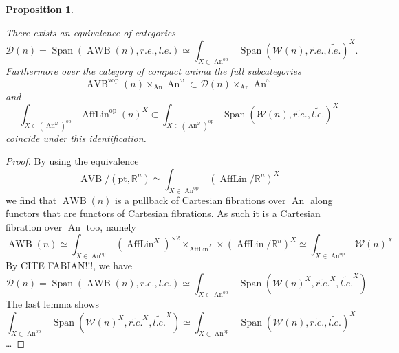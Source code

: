 \documentclass{article}
\newcommand{\R}{\mathbb{R}} %
\newcommand{\cD}{\mathcal{D}}
\newcommand{\pt}{\mathrm{pt}}
\newcommand{\op}{\mathrm{op}}
\newcommand{\vop}{\mathrm{vop}}
\DeclareMathOperator{\AVB}{AVB}
\DeclareMathOperator{\AWB}{AWB}
\DeclareMathOperator{\An}{An}
\DeclareMathOperator{\AffLin}{AffLin}
\DeclareMathOperator{\Span}{Span}
\newtheorem{proposition}{Proposition}
\begin{document}
\begin{proposition}\label{prop: asunst}

There exists an equivalence of categories 
\[
    \cD(n) = \Span(\AWB(n), r.e., l.e.) \simeq \int_{X \in \An^\op}\Span(\mathcal W(n), \tilde{r.e.}, \tilde{l.e.})^X.
\]
Furthermore over the category of compact anima
the full subcategories 
\[
    \AVB^\vop(n) \times_{\An}\An^\omega \subset \cD(n) \times_{\An}\An^\omega
\]
and 
\[
    \int_{X \in (\An^\omega)^\op} \AffLin^\op(n)^X \subset \int_{X \in (\An^\omega)^\op}\Span(\mathcal W(n), \tilde{r.e.}, \tilde{l.e.})^X
\]
coincide under this identification.


\end{proposition}
\begin{proof}
    By using the equivalence 
    \[
    \AVB/(\pt, \R^n) \simeq \int_{X \in \An^\op} (\AffLin/\R^n)^X   
    \]
    we find that $\AWB(n)$ is a pullback of Cartesian fibrations over $\An$ along functors that 
    are functors of Cartesian fibrations.
    As such it is a Cartesian fibration over $\An$ too, namely
    \[
    \AWB(n) \simeq \int_{X \in \An^\op} (\AffLin^X)^{\times 2} \times_{\AffLin^X} \times (\AffLin/\R^n)^X \simeq \int_{X \in \An^\op} \mathcal W(n)^X
    \]
    By CITE FABIAN!!!, we have 
    \[
    \cD(n) = \Span(\AWB(n), r.e., l.e.) \simeq \int_{X \in \An^\op} \Span(\mathcal W(n)^X, \tilde{r.e.}^X, \tilde{l.e.}^X)    
    \]
    The last lemma shows 
    \[
        \int_{X \in \An^\op} \Span(\mathcal W(n)^X, \tilde{r.e.}^X, \tilde{l.e.}^X) \simeq \int_{X \in \An^\op} \Span(\mathcal W(n), \tilde{r.e.}, \tilde{l.e.})^X  
    \]
    \dots


\end{proof}    
    
\end{document}
